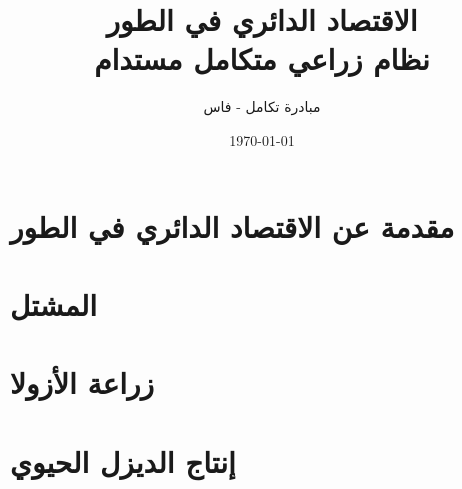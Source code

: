 \documentclass[12pt,a4paper]{report}
\title{الاقتصاد الدائري في الطور\\
\large نظام زراعي متكامل مستدام}
\author{مبادرة تكامل - فاس}
\date{\today}
\begin{document}
\maketitle
\tableofcontents

\chapter{مقدمة عن الاقتصاد الدائري في الطور}


\chapter{المشتل}









\chapter{زراعة الأزولا}









\chapter{إنتاج الديزل الحيوي}








\end{document}
